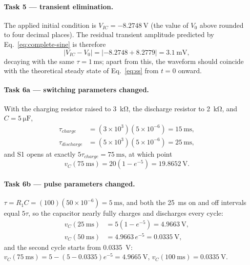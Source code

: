 \documentclass[12pt,a4paper]{article}
\begin{document}
	\paragraph{Task 5 --- transient elimination.}
	The applied initial condition is
	$V_{IC} = \SI{-8.2748}{\volt}$ (the value of $V_0$ above rounded to
	four decimal places).  The residual transient amplitude predicted by
	Eq.~\eqref{eq:complete-sine} is therefore
	\begin{equation}
		\left|V_{IC} - V_0\right| = \left|-8.2748 + 8.2779\right|
		= \SI{3.1}{\milli\volt},
	\end{equation}
	decaying with the same $\tau = \SI{1}{\milli\second}$; apart from
	this, the waveform should coincide with the theoretical steady state
	of Eq.~\eqref{eq:ss} from $t = 0$ onward.
	
	\paragraph{Task 6a --- switching parameters changed.}
	With the charging resistor raised to \SI{3}{\kilo\ohm}, the
	discharge resistor to \SI{2}{\kilo\ohm}, and
	$C = \SI{5}{\micro\farad}$,
	\begin{align}
		\tau_{charge} &= \left(3\times 10^{3}\right)\left(5\times 10^{-6}\right)
		= \SI{15}{\milli\second}, \\
		\tau_{discharge} &= \left(5\times 10^{3}\right)\left(5\times 10^{-6}\right)
		= \SI{25}{\milli\second},
	\end{align}
	and S1 opens at exactly $5\tau_{charge} =
	\SI{75}{\milli\second}$, at which point
	\begin{equation}
		v_C(\SI{75}{\milli\second}) = 20\left(1 - e^{-5}\right)
		= \SI{19.8652}{\volt}.
	\end{equation}
	
	\paragraph{Task 6b --- pulse parameters changed.}
	$\tau = R_1 C = (100)\left(50\times 10^{-6}\right) =
	\SI{5}{\milli\second}$, and both the \SI{25}{\milli\second} on and
	off intervals equal $5\tau$, so the capacitor nearly fully charges
	and discharges every cycle:
	\begin{align}
		v_C(\SI{25}{\milli\second}) &= 5\left(1 - e^{-5}\right)
		= \SI{4.9663}{\volt},\\
		v_C(\SI{50}{\milli\second}) &= 4.9663\, e^{-5} = \SI{0.0335}{\volt},
	\end{align}
	and the second cycle starts from \SI{0.0335}{\volt}:
	$v_C(\SI{75}{\milli\second}) = 5 - (5 - 0.0335)e^{-5} =
	\SI{4.9665}{\volt}$, $v_C(\SI{100}{\milli\second}) = \SI{0.0335}{\volt}$.
	
\end{document}
